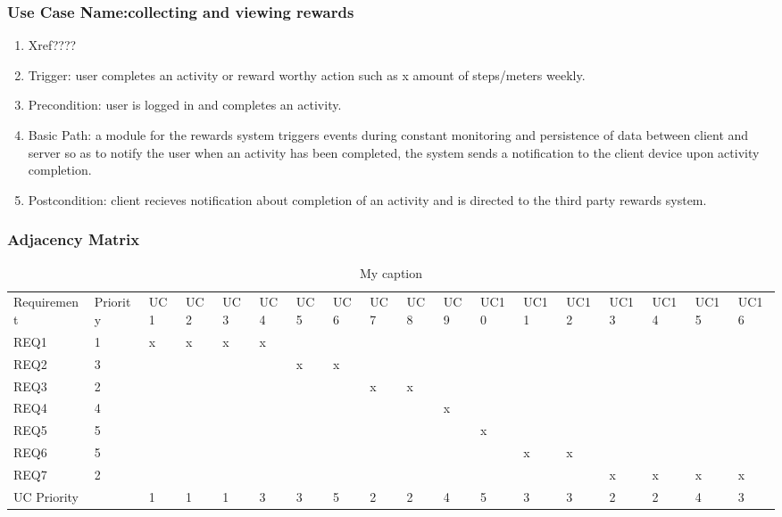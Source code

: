 \documentclass[11pt,a4paper]{article}
\begin{document}
			\subsubsection{Use Case Name:collecting and viewing rewards}
				\begin{enumerate}
				\renewcommand{\labelenumi}{{\textbf{\arabic{enumi}.}}}
				\item Xref????  %
				\item Trigger: user completes an activity or reward worthy action such as x amount of steps/meters weekly.
				\item Precondition: user is logged in and completes an activity.
				\item Basic Path: a module for the rewards system triggers events during constant monitoring and persistence of data between client and server so as to notify the user when an activity has been completed, the system sends a notification to the client device upon activity completion.
				\item Postcondition: client recieves notification about completion of an activity and is directed to the third party rewards system.
				\end{enumerate}
		\subsubsection{Adjacency Matrix}
		\begin{table}[]
\centering
\caption{My caption}
\label{my-label}
\begin{tabular}{llllllllllllllllll}
Requirement      & Priority     & UC1 & UC2 & UC3 & UC4 & UC5 & UC6 & UC7 & UC8 & UC9 & UC10 & UC11 & UC12 & UC13 & UC14 & UC15 & UC16 \\
REQ1             & 1            & x   & x   & x   & x   &     &     &     &     &     &      &      &      &      &      &      &      \\
REQ2             & 3            &     &     &     &     & x   & x   &     &     &     &      &      &      &      &      &      &      \\
REQ3             & 2            &     &     &     &     &     &     & x   & x   &     &      &      &      &      &      &      &      \\
REQ4             & 4            &     &     &     &     &     &     &     &     & x   &      &      &      &      &      &      &      \\
REQ5             & 5            &     &     &     &     &     &     &     &     &     & x    &      &      &      &      &      &      \\
REQ6             & 5            &     &     &     &     &     &     &     &     &     &      & x    & x    &      &      &      &      \\
REQ7             & 2            &     &     &     &     &     &     &     &     &     &      &      &      & x    & x    & x    & x    \\
\multicolumn{2}{l}{UC Priority} & 1   & 1   & 1   & 3   & 3   & 5   & 2   & 2   & 4   & 5    & 3    & 3    & 2    & 2    & 4    & 3   
\end{tabular}
\end{table}
\end{document}
